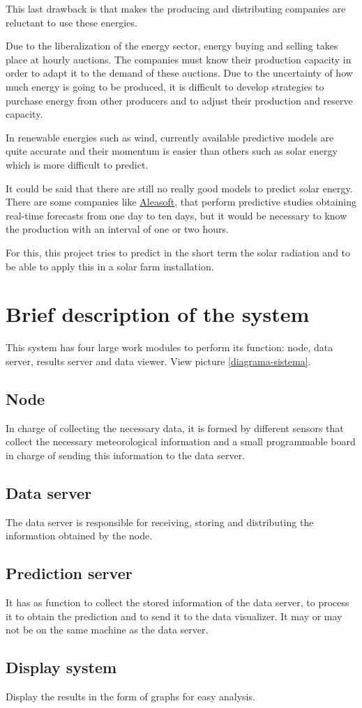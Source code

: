 This last drawback is that makes the producing and distributing companies are reluctant to use these energies.

Due to the liberalization of the energy sector, energy buying and selling takes place at hourly auctions. The companies must know their production capacity in order to adapt it to the demand of these auctions. Due to the uncertainty of how much energy is going to be produced, it is difficult to develop strategies to purchase energy from other producers and to adjust their production and reserve capacity.

In renewable energies such as wind, currently available predictive models are quite accurate and their momentum is easier than others such as solar energy which is more difficult to predict.

It could be said that there are still no really good models to predict solar energy. There are some companies like \href{https://aleasoft.com/es/}{Aleasoft}, that perform predictive studies obtaining real-time forecasts from one day to ten days, but it would be necessary to know the production with an interval of one or two hours.

For this, this project tries to predict in the short term the solar radiation and to be able to apply this in a solar farm installation.

\section{Brief description of the system}
\label{makereference2.2}
This system has four large work modules to perform its function: node, data server, results server and data viewer. View picture \ref{diagrama-sistema}.

\subsection{Node}
\label{makereference2.2.1}
In charge of collecting the necessary data, it is formed by different sensors that collect the necessary meteorological information and a small programmable board in charge of sending this information to the data server.

\subsection{Data server}
\label{makereference2.2.2}
The data server is responsible for receiving, storing and distributing the information obtained by the node.

\subsection{Prediction server}
\label{makereference2.2.3}
It has as function to collect the stored information of the data server, to process it to obtain the prediction and to send it to the data visualizer. It may or may not be on the same machine as the data server.

\subsection{Display system}
\label{makereference2.2.4}
Display the results in the form of graphs for easy analysis.